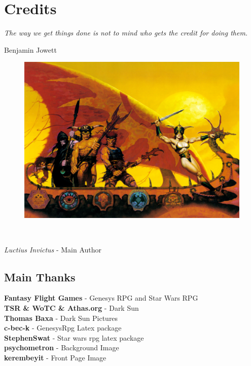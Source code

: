 \chapter{Credits}\label{chap:credits}
\epigraph{\textit{
    The way we get things done is not to mind who gets the credit for doing them.
} }{
    Benjamin Jowett
}

\begin{figure}[H]
\centering
\includegraphics[width=0.4\linewidth]{images/bromdarksun.jpg}
\end{figure}

\begin{centering}
    \\
\end{centering}

\begin{centering}
\textit{Luctius Invictus} - Main Author\\
\end{centering}

\section{Main Thanks}
\begin{centering}
\textbf{Fantasy Flight Games} - Genesys RPG and Star Wars RPG\\
\textbf{TSR \& WoTC \& Athas.org} - Dark Sun\\
\textbf{Thomas Baxa} - Dark Sun Pictures\\
\textbf{c-bec-k} - GenesysRpg Latex package\\
\textbf{StephenSwat} - Star wars rpg latex package\\
\textbf{psychometron} - Background Image\\
\textbf{kerembeyit} - Front Page Image\\
\end{centering}

